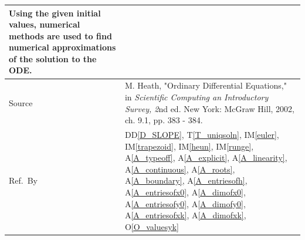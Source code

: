 \documentclass[12pt]{article}
\newcommand{\colAwidth}{0.13\textwidth}
\newcommand{\colBwidth}{0.82\textwidth}
\newcommand{\ddref}[1]{DD\ref{#1}}
\newcommand{\tref}[1]{T\ref{#1}}
\newcommand{\aref}[1]{A\ref{#1}}
\newcommand{\iref}[1]{IM\ref{#1}}
\newcommand{\oref}[1]{O\ref{#1}}
\begin{document}
\begin{minipage}{\textwidth}
\begin{tabular}{| p{\colAwidth} | p{\colBwidth}|}
                Using the given initial values, numerical methods are used to find numerical approximations of the solution to the ODE. 
                \\
  \hline
  Source &
           M. Heath, "Ordinary Differential Equations," in \textit{Scientific Computing an
           Introductory Survey, 2}nd ed. New York: McGraw Hill, 2002, ch. 9.1, pp. 383 - 384.
           ~\cite{Heath2002} 
           \\
  \hline
  Ref.\ By & \ddref{D_SLOPE}, \tref{T_uniqsoln}, \iref{euler}, \iref{trapezoid}, \iref{heun},
  \iref{runge}, \aref{A_typeoff}, \aref{A_explicit}, \aref{A_linearity},
  \aref{A_continuous}, \aref{A_roots}, \aref{A_boundary}, \aref{A_entriesofh}, 
  \aref{A_entriesofx0}, \aref{A_dimofx0}, \aref{A_entriesofy0}, \aref{A_dimofy0},
  \aref{A_entriesofxk}, \aref{A_dimofxk}, \oref{O_valuesyk}\\
  \hline
\end{tabular}
\end{minipage}\\

~\newline
\end{document}
